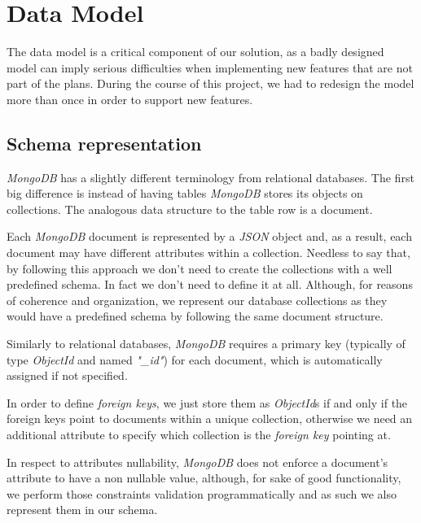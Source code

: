 
\section{Data Model}
The data model is a critical component of our solution, as a badly designed model can imply serious difficulties when implementing new features that are not part of the plans. During the course of this project, we had to redesign the model more than once in order to support new features.

%
\subsection {Schema representation}
    \emph{MongoDB} has a slightly different terminology from relational databases. The first big difference is instead of having tables \emph{MongoDB} stores its objects on collections. The analogous data structure to the table row is a document.

    Each \emph{MongoDB} document is represented by a \emph{JSON} object and, as a result, each document may have different attributes within a collection. Needless to say that, by following this approach we don't need to create the collections with a well predefined schema. In fact we don't need to define it at all. Although, for reasons of coherence and organization, we represent our database collections as they would have a predefined schema by following the same document structure.

    Similarly to relational databases, \emph{MongoDB} requires a primary key (typically of type \emph{ObjectId} and named \emph{"\_id"}) for each document, which is automatically assigned if not specified. 

    In order to define \emph{foreign keys}, we just store them as \emph{ObjectId}s if and only if the foreign keys point to documents within a unique collection, otherwise we need an additional attribute to specify which collection is the \emph{foreign key} pointing at.

    In respect to attributes nullability, \emph{MongoDB} does not enforce a document's attribute to have a non nullable value, although, for sake of good functionality, we perform those constraints validation programmatically and as such we also represent them in our schema.
    
